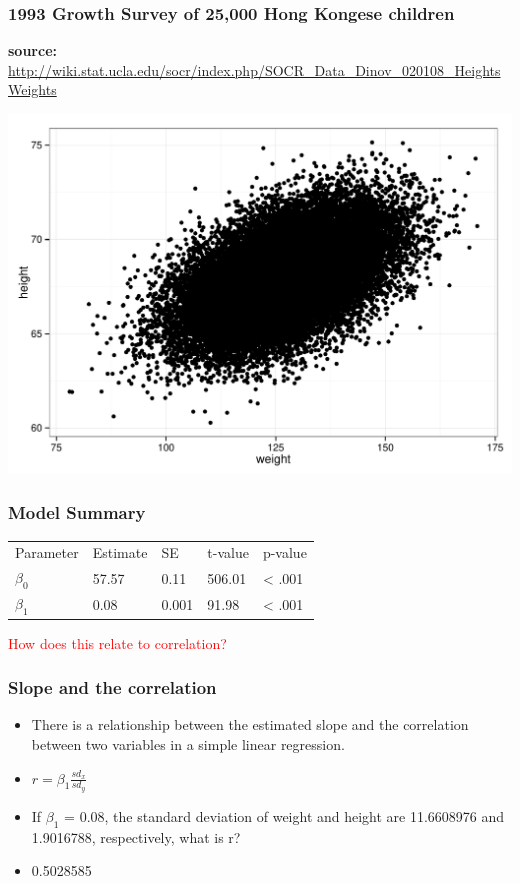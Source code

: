 \documentclass[dvipsnames]{beamer}\usepackage[]{graphicx}\usepackage[]{color}
\makeatletter
\def\maxwidth{ %
  \ifdim\Gin@nat@width>\linewidth
    \linewidth
  \else
    \Gin@nat@width
  \fi
}
\newenvironment{knitrout}{}{} %
\makeatother
\begin{document}
\begin{frame}
\frametitle{1993 Growth Survey of 25,000 Hong Kongese children}
\footnotesize \textbf{source:} \url{http://wiki.stat.ucla.edu/socr/index.php/SOCR_Data_Dinov_020108_HeightsWeights}
\begin{knitrout}
\color{fgcolor}

{\centering \includegraphics[width=\maxwidth]{figure/unnamed-chunk-4-1} 

}



\end{knitrout}
\end{frame}

\begin{frame}[fragile]
\frametitle{Model Summary}
\begin{tabular}{lllll}
\hline
Parameter & Estimate & SE & t-value & p-value \\
$\beta_0$ & 57.57  & 0.11 & 506.01 & < .001 \\
$\beta_1$ & 0.08 & 0.001 & 91.98 & < .001 \\
\hline
\end{tabular}

\vspace{.5cm}
\textcolor{red}{How does this relate to correlation?}
\end{frame}

\begin{frame}
\frametitle{Slope and the correlation}
\begin{itemize}
\item<1-> There is a relationship between the estimated slope and the correlation between two variables in a simple linear regression.
\item<2-> $r = \beta_1 \frac{sd_x}{sd_y}$ 
\item<3-> If $\beta_1$ = 0.08, the standard deviation of weight and height are 11.6608976 and 1.9016788, respectively, what is r?
\item<4-> 0.5028585
\end{itemize}

\end{frame}
\end{document}
